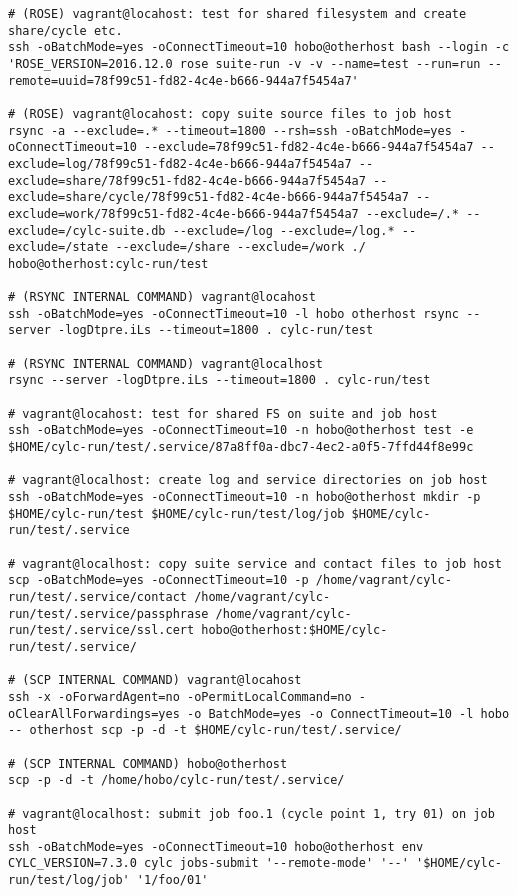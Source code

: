 \lstset{breaklines=true}
\begin{lstlisting}
# (ROSE) vagrant@locahost: test for shared filesystem and create share/cycle etc.
ssh -oBatchMode=yes -oConnectTimeout=10 hobo@otherhost bash --login -c 'ROSE_VERSION=2016.12.0 rose suite-run -v -v --name=test --run=run --remote=uuid=78f99c51-fd82-4c4e-b666-944a7f5454a7'

# (ROSE) vagrant@locahost: copy suite source files to job host
rsync -a --exclude=.* --timeout=1800 --rsh=ssh -oBatchMode=yes -oConnectTimeout=10 --exclude=78f99c51-fd82-4c4e-b666-944a7f5454a7 --exclude=log/78f99c51-fd82-4c4e-b666-944a7f5454a7 --exclude=share/78f99c51-fd82-4c4e-b666-944a7f5454a7 --exclude=share/cycle/78f99c51-fd82-4c4e-b666-944a7f5454a7 --exclude=work/78f99c51-fd82-4c4e-b666-944a7f5454a7 --exclude=/.* --exclude=/cylc-suite.db --exclude=/log --exclude=/log.* --exclude=/state --exclude=/share --exclude=/work ./ hobo@otherhost:cylc-run/test

# (RSYNC INTERNAL COMMAND) vagrant@locahost
ssh -oBatchMode=yes -oConnectTimeout=10 -l hobo otherhost rsync --server -logDtpre.iLs --timeout=1800 . cylc-run/test

# (RSYNC INTERNAL COMMAND) vagrant@localhost 
rsync --server -logDtpre.iLs --timeout=1800 . cylc-run/test

# vagrant@locahost: test for shared FS on suite and job host
ssh -oBatchMode=yes -oConnectTimeout=10 -n hobo@otherhost test -e $HOME/cylc-run/test/.service/87a8ff0a-dbc7-4ec2-a0f5-7ffd44f8e99c

# vagrant@localhost: create log and service directories on job host
ssh -oBatchMode=yes -oConnectTimeout=10 -n hobo@otherhost mkdir -p $HOME/cylc-run/test $HOME/cylc-run/test/log/job $HOME/cylc-run/test/.service

# vagrant@localhost: copy suite service and contact files to job host
scp -oBatchMode=yes -oConnectTimeout=10 -p /home/vagrant/cylc-run/test/.service/contact /home/vagrant/cylc-run/test/.service/passphrase /home/vagrant/cylc-run/test/.service/ssl.cert hobo@otherhost:$HOME/cylc-run/test/.service/

# (SCP INTERNAL COMMAND) vagrant@locahost 
ssh -x -oForwardAgent=no -oPermitLocalCommand=no -oClearAllForwardings=yes -o BatchMode=yes -o ConnectTimeout=10 -l hobo -- otherhost scp -p -d -t $HOME/cylc-run/test/.service/

# (SCP INTERNAL COMMAND) hobo@otherhost
scp -p -d -t /home/hobo/cylc-run/test/.service/

# vagrant@localhost: submit job foo.1 (cycle point 1, try 01) on job host
ssh -oBatchMode=yes -oConnectTimeout=10 hobo@otherhost env CYLC_VERSION=7.3.0 cylc jobs-submit '--remote-mode' '--' '$HOME/cylc-run/test/log/job' '1/foo/01'


\end{lstlisting}
